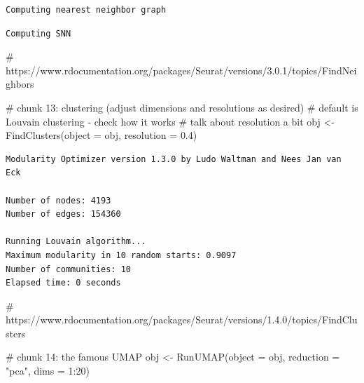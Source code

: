 \documentclass[
  letterpaper,
  DIV=11,
  numbers=noendperiod]{scrartcl}
\newenvironment{Shaded}{\begin{snugshade}}{\end{snugshade}}
\newcommand{\AttributeTok}[1]{\textcolor[rgb]{0.40,0.45,0.13}{#1}}
\newcommand{\CommentTok}[1]{\textcolor[rgb]{0.37,0.37,0.37}{#1}}
\newcommand{\DecValTok}[1]{\textcolor[rgb]{0.68,0.00,0.00}{#1}}
\newcommand{\FloatTok}[1]{\textcolor[rgb]{0.68,0.00,0.00}{#1}}
\newcommand{\FunctionTok}[1]{\textcolor[rgb]{0.28,0.35,0.67}{#1}}
\newcommand{\NormalTok}[1]{\textcolor[rgb]{0.00,0.23,0.31}{#1}}
\newcommand{\OtherTok}[1]{\textcolor[rgb]{0.00,0.23,0.31}{#1}}
\newcommand{\SpecialCharTok}[1]{\textcolor[rgb]{0.37,0.37,0.37}{#1}}
\newcommand{\StringTok}[1]{\textcolor[rgb]{0.13,0.47,0.30}{#1}}
\begin{document}
\begin{verbatim}
Computing nearest neighbor graph
\end{verbatim}

\begin{verbatim}
Computing SNN
\end{verbatim}

\begin{Shaded}
\begin{Highlighting}[]
\CommentTok{\# https://www.rdocumentation.org/packages/Seurat/versions/3.0.1/topics/FindNeighbors}
\end{Highlighting}
\end{Shaded}

\begin{Shaded}
\begin{Highlighting}[]
\CommentTok{\# chunk 13: clustering (adjust dimensions and resolutions as desired)}
\CommentTok{\# default is Louvain clustering {-} check how it works}
\CommentTok{\# talk about resolution a bit}
\NormalTok{obj }\OtherTok{\textless{}{-}} \FunctionTok{FindClusters}\NormalTok{(}\AttributeTok{object =}\NormalTok{ obj, }\AttributeTok{resolution =} \FloatTok{0.4}\NormalTok{)}
\end{Highlighting}
\end{Shaded}

\begin{verbatim}
Modularity Optimizer version 1.3.0 by Ludo Waltman and Nees Jan van Eck

Number of nodes: 4193
Number of edges: 154360

Running Louvain algorithm...
Maximum modularity in 10 random starts: 0.9097
Number of communities: 10
Elapsed time: 0 seconds
\end{verbatim}

\begin{Shaded}
\begin{Highlighting}[]
\CommentTok{\# https://www.rdocumentation.org/packages/Seurat/versions/1.4.0/topics/FindClusters}
\end{Highlighting}
\end{Shaded}

\begin{Shaded}
\begin{Highlighting}[]
\CommentTok{\# chunk 14: the famous UMAP}
\NormalTok{obj }\OtherTok{\textless{}{-}} \FunctionTok{RunUMAP}\NormalTok{(}\AttributeTok{object =}\NormalTok{ obj, }\AttributeTok{reduction =} \StringTok{"pca"}\NormalTok{, }\AttributeTok{dims =} \DecValTok{1}\SpecialCharTok{:}\DecValTok{20}\NormalTok{)}
\end{Highlighting}
\end{Shaded}
\end{document}
